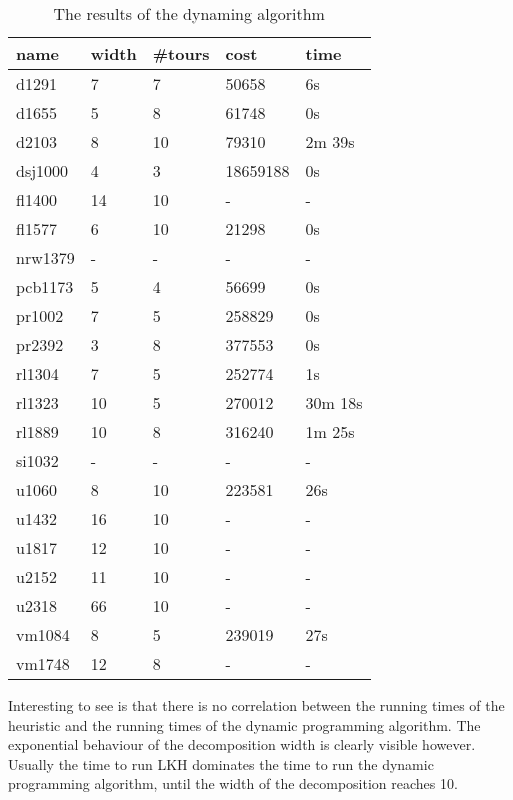 \documentclass[12pt]{article}
\begin{document}
    \begin{table}
    \begin{tabular}{l l l l l}
        name    & width & \#tours   & cost      & time \\ \hline
        d1291   & 7     & 7         & 50658     & 6s \\
        d1655   & 5     & 8         & 61748     & 0s \\
        d2103   & 8     & 10        & 79310     & 2m 39s \\
        dsj1000 & 4     & 3         & 18659188  & 0s \\
        fl1400  & 14    & 10        & -         & - \\
        fl1577  & 6     & 10        & 21298     & 0s \\
        nrw1379 & -     & -         & -         & - \\
        pcb1173 & 5     & 4         & 56699     & 0s \\
        pr1002  & 7     & 5         & 258829    & 0s \\
        pr2392  & 3     & 8         & 377553    & 0s \\
        rl1304  & 7     & 5         & 252774    & 1s \\
        rl1323  & 10    & 5         & 270012    & 30m 18s \\
        rl1889  & 10    & 8         & 316240    & 1m 25s \\
        si1032  & -     & -         & -         & - \\
        u1060   & 8     & 10        & 223581    & 26s \\
        u1432   & 16    & 10        & -         & - \\
        u1817   & 12    & 10        & -         & - \\
        u2152   & 11    & 10        & -         & - \\
        u2318   & 66    & 10        & -         & - \\
        vm1084  & 8     & 5         & 239019    & 27s \\
        vm1748  & 12    & 8         & -         & - \\
    \end{tabular}
    \caption{The results of the dynaming algorithm}
    \label{table:tsp-dp}
    \end{table}

    Interesting to see is that there is no correlation between the running times of the heuristic
    and the running times of the dynamic programming algorithm. The exponential behaviour of the
    decomposition width is clearly visible however. Usually the time to run LKH dominates the time
    to run the dynamic programming algorithm, until the width of the decomposition reaches 10.
\end{document}
